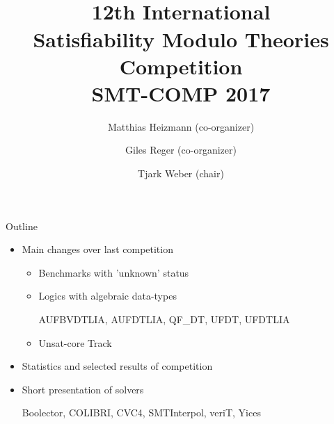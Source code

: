 \documentclass{beamer}
\title{${}$\\[3.5em]12th International\\
Satisfiability Modulo Theories\\
Competition\\[.7em]
SMT-COMP 2017\\[3em]}
\author{Matthias Heizmann (co-organizer)\\ 
\and Giles Reger (co-organizer)\\ 
\and Tjark Weber (chair)\\
}
\institute{}
\date{}
\begin{document}

\frame{\titlepage}
\logo{}


\section{}%
\subsection{}%


% 
% 
% 
% 
% 
% 
% 


\begin{frame}{Outline}
\begin{itemize}
 \item Main changes over last competition
\begin{itemize}
\item Benchmarks with 'unknown' status

\item Logics with algebraic data-types

{\scriptsize AUFBVDTLIA, AUFDTLIA, QF\_DT, UFDT, UFDTLIA}

\item Unsat-core Track
\end{itemize}

\vfill

 \item Statistics and selected results of competition
 
\vfill

 \item Short presentation of solvers
 
 \small
 Boolector, COLIBRI, CVC4, SMTInterpol, veriT, Yices
 
 
\end{itemize}

 
\end{frame}
\end{document}
